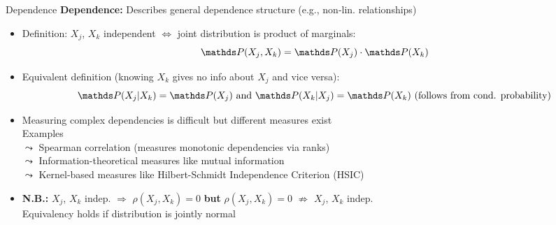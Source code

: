 \documentclass[10pt,compress,t,notes=noshow, xcolor=table]{beamer}
\begin{document}
\begin{frame}{Dependence}
\textbf{Dependence:} Describes general dependence structure  (e.g., non-lin. relationships)

\begin{itemize}[<+->]
\item Definition: $X_j$, $X_k$ independent $\Leftrightarrow$ joint distribution is product of marginals:%
$$\P(X_j, X_k) = \P(X_j) \cdot \P(X_k)$$
\item Equivalent definition (knowing $X_k$ gives no info about $X_j$ and vice versa): 
$$\P(X_j|X_k) = \P(X_j) \text{ and } \P(X_k|X_j) = \P(X_k) \text{ (follows from cond. probability)}$$ 
\item Measuring complex dependencies is difficult but different measures exist\\ Examples \\
$\leadsto$ Spearman correlation (measures monotonic dependencies via ranks) \\
$\leadsto$ Information-theoretical measures like mutual information \\
$\leadsto$ Kernel-based measures like Hilbert-Schmidt Independence Criterion (HSIC) %
\item \textbf{N.B.:} $X_j$, $X_k$ indep. $\Rightarrow$ $\rho(X_j, X_k) = 0$ \textbf{but} $\rho(X_j, X_k) = 0$ $\nRightarrow$ $X_j$, $X_k$  indep. \\
Equivalency holds if distribution is jointly normal
\end{itemize}
\end{frame}
\end{document}
